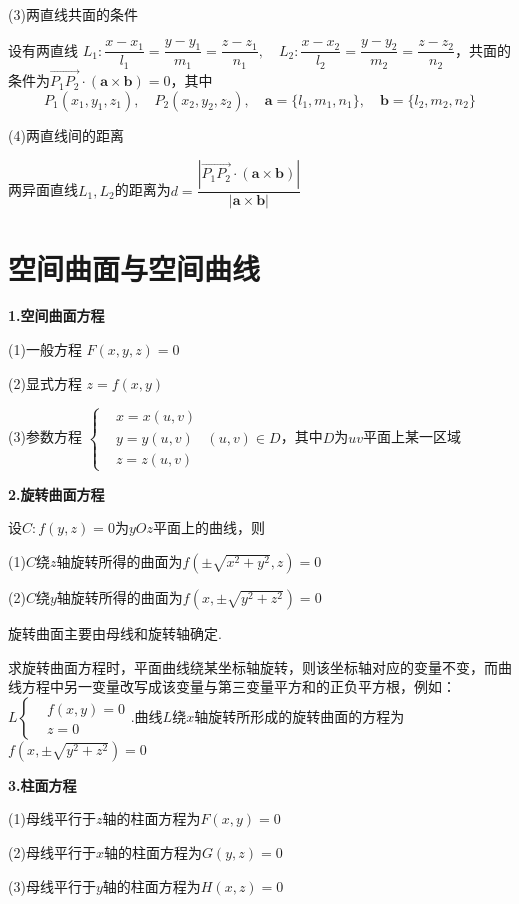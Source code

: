 (3)两直线共面的条件

设有两直线 \quad $L_1:\dfrac{x-x_1}{l_1}=\dfrac{y-y_1}{m_1}=\dfrac{z-z_1}{n_1}, \quad L_2:\dfrac{x-x_2}{l_2}=\dfrac{y-y_2}{m_2}=\dfrac{z-z_2}{n_2}$，共面的条件为$\overrightarrow{P_1P_2}\cdot(\bm{a}\times\bm{b})=0$，其中
\begin{equation}
    P_1(x_1,y_1,z_1), \quad P_2(x_2,y_2,z_2), \quad \bm{a}=\{l_1,m_1,n_1\}, \quad \bm{b}=\{l_2,m_2,n_2\}
\end{equation}

(4)两直线间的距离

两异面直线$L_1,L_2$的距离为$d=\dfrac{|\overrightarrow{P_1P_2}\cdot(\bm{a}\times\bm{b})|}{|\bm{a}\times\bm{b}|}$

\section{空间曲面与空间曲线}
\textbf{1.空间曲面方程}

(1)一般方程 $F(x,y,z)=0$

(2)显式方程 $z=f(x,y)$

(3)参数方程 $\left\{\begin{aligned}& x=x(u,v) \\ & y=y(u,v) \\ & z=z(u,v) \end{aligned}\right.$ \quad $(u,v)\in D$，其中$D$为$uv$平面上某一区域

\textbf{2.旋转曲面方程}

设$C:f(y,z)=0$为$yOz$平面上的曲线，则

(1)$C$绕$z$轴旋转所得的曲面为$f(\pm\sqrt{x^2+y^2},z)=0$

(2)$C$绕$y$轴旋转所得的曲面为$f(x,\pm\sqrt{y^2+z^2})=0$

旋转曲面主要由母线和旋转轴确定.

求旋转曲面方程时，平面曲线绕某坐标轴旋转，则该坐标轴对应的变量不变，而曲线方程中另一变量改写成该变量与第三变量平方和的正负平方根，例如：$L\left\{\begin{aligned}& f(x,y)=0 \\ & z=0 \end{aligned}\right.$.曲线$L$绕$x$轴旋转所形成的旋转曲面的方程为$f(x,\pm\sqrt{y^2+z^2})=0$

\textbf{3.柱面方程}

(1)母线平行于$z$轴的柱面方程为$F(x,y)=0$

(2)母线平行于$x$轴的柱面方程为$G(y,z)=0$

(3)母线平行于$y$轴的柱面方程为$H(x,z)=0$

